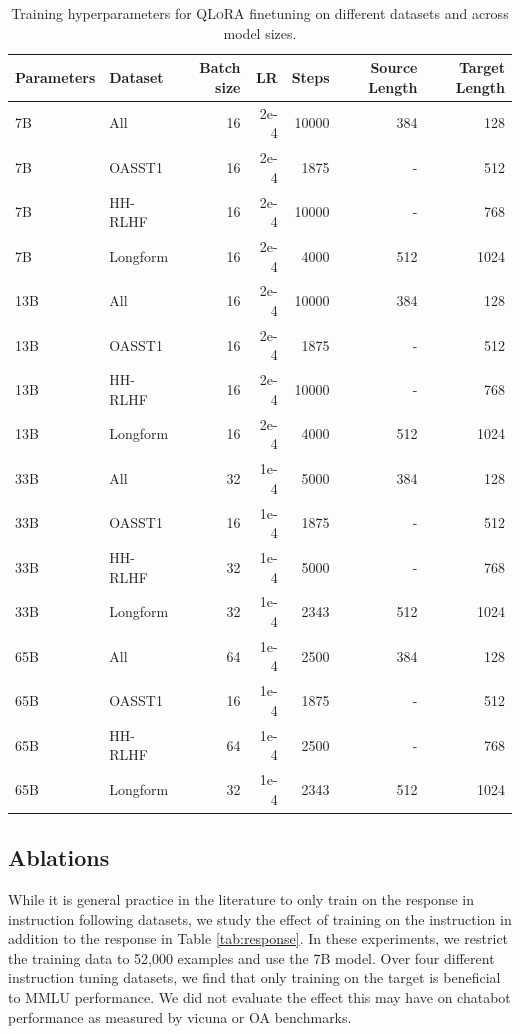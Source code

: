 \documentclass{article}
\newcommand{\method}{\textsc{QLoRA}\xspace}
\begin{document}
\begin{table}[]
    \centering
    \begin{tabular}{llrrrrr}
        \toprule
        Parameters & Dataset & Batch size & LR & Steps &  Source Length & Target Length \\
        \midrule
        7B & All         & 16 & 2e-4 & 10000 & 384 & 128 \\
        7B & OASST1      & 16 & 2e-4 & 1875 & - & 512\\
        7B & HH-RLHF     & 16 & 2e-4 & 10000 & - & 768 \\
        7B & Longform    & 16 & 2e-4 & 4000 & 512 & 1024\\
        \midrule
        13B & All        & 16 & 2e-4 & 10000 & 384 & 128 \\
        13B & OASST1     & 16 & 2e-4 & 1875 & - & 512\\
        13B & HH-RLHF    & 16 & 2e-4 & 10000 & - & 768 \\
        13B & Longform   & 16 & 2e-4 & 4000 & 512 & 1024\\
        \midrule
        33B & All        & 32 & 1e-4 & 5000 & 384 & 128 \\
        33B & OASST1     & 16 & 1e-4 & 1875 & - & 512 \\
        33B & HH-RLHF    & 32 & 1e-4 & 5000 & - & 768 \\
        33B & Longform   & 32 & 1e-4 & 2343 & 512 & 1024 \\
        \midrule
        65B & All        & 64 & 1e-4 & 2500 & 384 & 128 \\
        65B & OASST1     & 16 & 1e-4 & 1875 & - & 512\\
        65B & HH-RLHF    & 64 & 1e-4 & 2500 & - & 768 \\
        65B & Longform   & 32 & 1e-4 & 2343 & 512 & 1024\\
        \bottomrule
    \end{tabular}
    \caption{Training hyperparameters for \method finetuning on different datasets and across model sizes.}
    \label{tab:hyperparams}
\end{table}

\subsection{Ablations}
While it is general practice in the literature to only train on the response in instruction following datasets, we study the effect of training on the instruction in addition to the response in Table \ref{tab:response}. In these experiments, we restrict the training data to 52,000 examples and use the 7B model. Over four different instruction tuning datasets, we find that only training on the target is beneficial to MMLU performance. We did not evaluate the effect this may have on chatabot performance as measured by vicuna or OA benchmarks.
\end{document}
